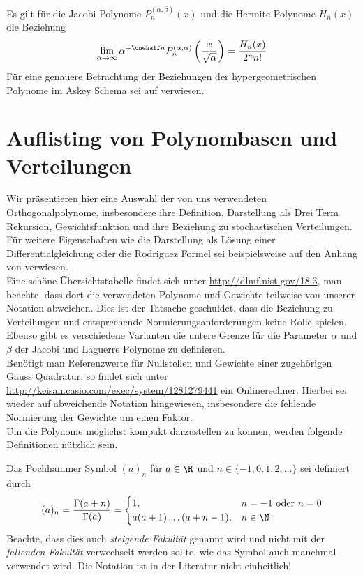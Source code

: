\begin{mathbsp}
Es gilt für die Jacobi Polynome $P_n^{(\alpha,\beta)}(x)$ und die Hermite Polynome $H_n(x)$ die Beziehung
\[\lim\limits_{\alpha\to\infty}\alpha^{-\onehalf n}P_n^{(\alpha,\alpha)}\left(\frac{x}{\sqrt{\alpha}}\right)=\frac{H_n(x)}{2^nn!}\]
Für eine genauere Betrachtung der Beziehungen der hypergeometrischen Polynome im Askey Schema sei auf \autocite{koekoekswart98} verwiesen.
\end{mathbsp}

\section{Auflisting von Polynombasen und Verteilungen}
Wir präsentieren hier eine Auswahl der von uns verwendeten Orthogonalpolynome, insbesondere ihre Definition, Darstellung als Drei Term Rekursion, Gewichtsfunktion und ihre Beziehung zu stochastischen Verteilungen. Für weitere Eigenschaften wie die Darstellung als Lösung einer Differentialgleichung oder die Rodriguez Formel sei beispielsweise auf den Anhang von \autocite{dongbinxiu2010} verwiesen.\\
Eine schöne Übersichtstabelle findet sich unter \url{http://dlmf.nist.gov/18.3}, man beachte, dass dort die verwendeten Polynome und Gewichte teilweise von unserer Notation abweichen. Dies ist der Tatsache geschuldet, dass die Beziehung zu Verteilungen und entsprechende Normierungsanforderungen keine Rolle spielen. Ebenso gibt es verschiedene Varianten die untere Grenze für die Parameter $\alpha$ und $\beta$ der Jacobi und Laguerre Polynome zu definieren.\\
Benötigt man Referenzwerte für Nullstellen und Gewichte einer zugehörigen Gauss Quadratur, so findet sich unter\\\url{http://keisan.casio.com/exec/system/1281279441} ein Onlinerechner. Hierbei sei wieder auf abweichende Notation hingewiesen, insbesondere die fehlende Normierung der Gewichte um einen Faktor.\\
Um die Polynome möglichst kompakt darzustellen zu können, werden folgende Definitionen nützlich sein.
\begin{mathdef}
Das Pochhammer Symbol $(a)_n$ für $a\in\R$ und $n\in\lbrace -1,0,1,2,\dots\rbrace$ sei definiert durch
\[(a)_n=\frac{\Gamma(a+n)}{\Gamma(a)}=
   \begin{cases}
   1, &n=-1\text{ oder } n=0\\
   a(a+1)\dots (a+n-1), &n\in\N
   \end{cases}
   \]
Beachte, dass dies auch \emph{steigende Fakultät} genannt wird und nicht mit der \emph{fallenden Fakultät} verwechselt werden sollte, wie das Symbol auch manchmal verwendet wird. Die Notation ist in der Literatur nicht einheitlich!
\end{mathdef}


